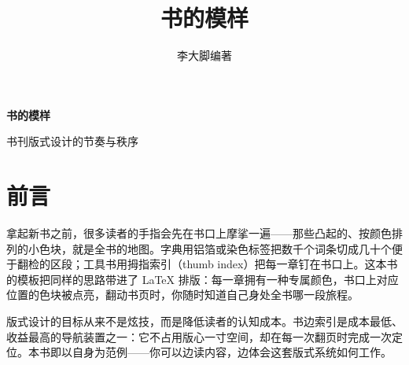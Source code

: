 \documentclass{bookedge}
\title{书的模样}
\author{李大脚\quad 编著}
\begin{document}
\maketitle                       %

\thispagestyle{empty}
\begin{titlepage}
  \null\vspace*{92mm}
  \begin{center}
    {\sffamily\bfseries\fontsize{20}{26}\selectfont\color{black!85}书的模样\par}
    \vskip 5mm
    {\sffamily\fontsize{10}{14}\selectfont\color{black!50}书刊版式设计的节奏与秩序\par}
  \end{center}
\end{titlepage}

\thispagestyle{empty}
\begingroup
  \vspace*{158mm}
  \setlength{\baselineskip}{16pt}
\endgroup
\clearpage

\chapter*{前言}

拿起新书之前，很多读者的手指会先在书口上摩挲一遍——那些凸起的、按颜色排列的小色块，就是全书的地图。字典用铝箔或染色标签把数千个词条切成几十个便于翻检的区段；工具书用拇指索引（thumb index）把每一章钉在书口上。这本书的模板把同样的思路带进了 \LaTeX{} 排版：每一章拥有一种专属颜色，书口上对应位置的色块被点亮，翻动书页时，你随时知道自己身处全书哪一段旅程。

版式设计的目标从来不是炫技，而是降低读者的认知成本。书边索引是成本最低、收益最高的导航装置之一：它不占用版心一寸空间，却在每一次翻页时完成一次定位。本书即以自身为范例——你可以边读内容，边体会这套版式系统如何工作。

\bigskip
{}
\end{document}
